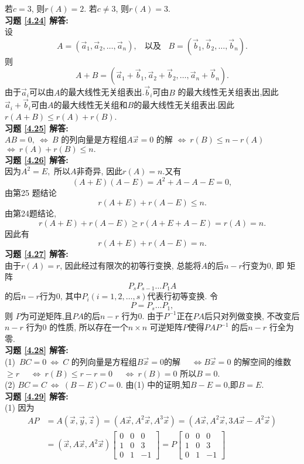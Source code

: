 \documentclass[a4paper]{book}
\begin{document}
若$c=3$, 则$r(A)=2$. 若$c\not=3$, 则$r(A)=3$.\\
\textbf{习题 \ref{4.24} 解答:}\\
设$$A=(\vec{a}_1,\vec{a}_2,\dots,\vec{a}_n),\ \ \ \ \mbox{以及}\ \ \ \   B=(\vec{b}_1,\vec{b}_2,\dots,\vec{b}_n).$$
则$$A+B=(\vec{a}_1+\vec{b}_1,\vec{a}_2+\vec{b}_2,\dots,\vec{a}_n+\vec{b}_n).$$
由于$\vec{a}_i$可以由$A$的最大线性无关组表出.$\vec{b}_i$可由$B$ 的最大线性无关组表出,因此$\vec{a}_i+\vec{b}_i$可由$A$的最大线性无关组和$B$的最大线性无关组表出.因此$r(A+B)\leq r(A)+r(B)$.\\
\textbf{习题 \ref{4.25} 解答:}\\
$AB=0,\ \Leftrightarrow \ B$ 的列向量是方程组$A\vec{x}=0$ 的解
  \quad  \quad  \quad \quad   $\Leftrightarrow\  r(B)\leq n-r(A)$
   \quad  \quad  \quad \quad  $\Leftrightarrow\ r(A)+r(B)\leq n.$\\
\textbf{习题 \ref{4.26} 解答:}\\
因为$A^2=E,$ 所以$A$非奇异, 因此$r(A)=n.$又有$$(A+E)(A-E)=A^2+A-A-E=0,$$ 由第25 题结论$$r(A+E)+r(A-E)\leq n.$$ 由第24题结论,  $$r(A+E)+r(A-E)\geq r(A+E+A-E)=r(A)=n.$$
因此有$$r(A+E)+r(A-E)=n.$$
\textbf{习题 \ref{4.27} 解答:}\\
由于$r(A)=r$, 因此经过有限次的初等行变换, 总能将$A$的后$n-r$行变为0, 即 矩阵$$P_sP_{s-1}\dots P_1A$$的后$n-r$行为0, 其中$P_i(i=1,2,\dots,s)$代表行初等变换. 令$$P=P_s\dots P_1,$$ 则
$P$为可逆矩阵,且$PA$的后$n-r$ 行为0. 由于$P^{-1}$正在$PA$后只对列做变换, 不改变后$n-r$ 行为0 的性质, 所以存在一个$n\times n$ 可逆矩阵$P$使得$PAP^{-1}$ 的后$n-r$ 行全为零.\\
\textbf{习题 \ref{4.28} 解答:}\\
(1)\ $BC=0\ \Leftrightarrow \ C$ 的列向量是方程组$B\vec{x}=0$的解
\quad \quad \quad \quad \quad  \ \ $ \Leftrightarrow B\vec{x}=0$ 的解空间的维数$\geq r$
\quad \quad \quad \quad \quad  \ \  $ \Leftrightarrow\ r(B)\leq r-r=0$
\quad \quad \quad \quad \quad  \ \  $ \Leftrightarrow\ r(B)=0$
所以$B=0$.\\
(2) $BC=C \ \Leftrightarrow \ (B-E)C=0$. 由(1) 中的证明,知$B-E=0$,即$B=E$.\\
\textbf{习题 \ref{4.29} 解答:}\\
(1) 因为\begin{displaymath}\begin{aligned}AP&=A(\vec{x},\vec{y},\vec{z})=(A\vec{x},A^2\vec{x},A^3\vec{x})=(A\vec{x},A^2\vec{x},3A\vec{x}-A^2\vec{x})\\
&=(\vec{x},A\vec{x},A^2\vec{x})\begin{bmatrix}0&0&0\\1&0&3\\0&1&-1\end{bmatrix}=P\begin{bmatrix}0&0&0\\1&0&3\\0&1&-1\end{bmatrix}\end{aligned}\end{displaymath}
\end{document}
